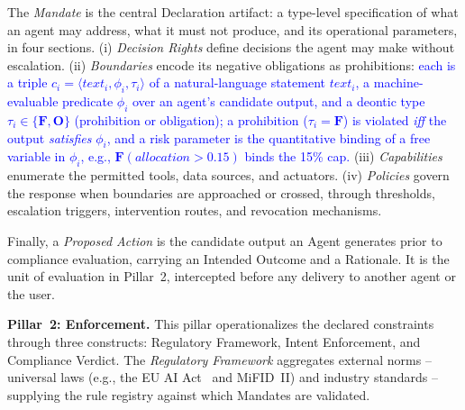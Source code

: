 \documentclass[runningheads]{llncs}
\begin{document}
The \textit{Mandate} is the central Declaration artifact: a
type-level specification of what an agent may address, what it must not produce, and its operational parameters, in four sections. (i) \textit{Decision Rights} define decisions the agent may make without escalation. (ii) \textit{Boundaries} encode its negative obligations as prohibitions: \textcolor{blue}{each is a triple $c_i = \langle \mathit{text}_i, \phi_i, \tau_i \rangle$ of a natural-language statement $\mathit{text}_i$, a machine-evaluable predicate $\phi_i$ over an agent's candidate output, and a deontic type $\tau_i \in \{\mathbf{F}, \mathbf{O}\}$  (prohibition or obligation); a prohibition ($\tau_i = \mathbf{F}$) is violated \emph{iff} the output \emph{satisfies} $\phi_i$, and a risk parameter is the quantitative binding of a free variable in $\phi_i$, e.g., $\mathbf{F}(\textit{allocation} > 0.15)$ binds the 15\% cap.} (iii) \textit{Capabilities} enumerate the permitted tools, data sources, and actuators. (iv) \textit{Policies} govern the response when boundaries are approached or crossed, through thresholds, escalation triggers, intervention routes, and revocation mechanisms.

Finally, a \textit{Proposed Action} is the candidate output an Agent generates prior to compliance evaluation, carrying an Intended Outcome and a Rationale. It is the unit of evaluation in Pillar~2, intercepted before any delivery to another agent or the user.

\vspace{6pt}
\textbf{Pillar~2: Enforcement.}
This pillar operationalizes the declared constraints through three constructs: Regulatory Framework, Intent Enforcement, and Compliance Verdict. The \textit{Regulatory Framework} aggregates external norms -- universal laws (e.g., the EU AI Act~\cite{euaiact2024} and MiFID~II) and industry standards -- supplying the rule registry against which Mandates are validated. 
\end{document}
